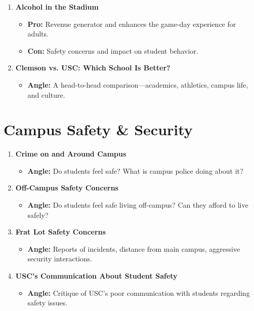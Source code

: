 \documentclass{article}
\begin{document}
\begin{enumerate}[leftmargin=*]
    \item \textbf{Alcohol in the Stadium}
    \begin{itemize}
        \item \textbf{Pro:} Revenue generator and enhances the game-day experience for adults.
        \item \textbf{Con:} Safety concerns and impact on student behavior.
    \end{itemize}

    \item \textbf{Clemson vs. USC: Which School Is Better?}
    \begin{itemize}
        \item \textbf{Angle:} A head-to-head comparison---academics, athletics, campus life, and culture.
    \end{itemize}
\end{enumerate}

\section*{Campus Safety \& Security}

\begin{enumerate}[leftmargin=*]
    \item \textbf{Crime on and Around Campus}
    \begin{itemize}
        \item \textbf{Angle:} Do students feel safe? What is campus police doing about it?
    \end{itemize}

    \item \textbf{Off-Campus Safety Concerns}
    \begin{itemize}
        \item \textbf{Angle:} Do students feel safe living off-campus? Can they afford to live safely?
    \end{itemize}

    \item \textbf{Frat Lot Safety Concerns}
    \begin{itemize}
        \item \textbf{Angle:} Reports of incidents, distance from main campus, aggressive security interactions.
    \end{itemize}

    \item \textbf{USC's Communication About Student Safety}
    \begin{itemize}
        \item \textbf{Angle:} Critique of USC's poor communication with students regarding safety issues.
    \end{itemize}
\end{enumerate}
\end{document}
